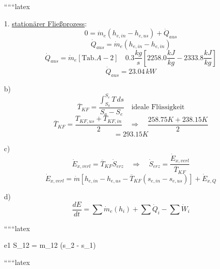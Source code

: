 
``````latex

1. \underline{stationärer Fließprozess}:
\[
0 = \dot{m}_e (h_{e,in} - h_{e,us}) + \dot{Q}_{aus}
\]
\[
\dot{Q}_{aus} = \dot{m}_e (h_{e,in} - h_{e,in})
\]
\[
\dot{Q}_{aus} = \dot{m}_e \left[ \text{Tab.} A-2 \right] \quad 0.3 \frac{kg}{s} \left[ 2258.0 \frac{kJ}{kg} - 2333.8 \frac{kJ}{kg} \right]
\]
\[
\dot{Q}_{aus} = 23.04 \, kW
\]

b)
\[
\overline{T}_{KF} = \frac{\int_{S_a}^{S_e} T \, ds}{S_a - S_e} \quad \text{ideale Flüssigkeit}
\]
\[
\overline{T}_{KF} = \frac{T_{KF,us} + T_{KF,in}}{2} \quad \Rightarrow \quad \frac{258.75 K + 238.15 K}{2}
\]
\[
= 293.15 K
\]

c)
\[
\dot{E}_{x,verl} = \overline{T}_{KF} \dot{S}_{erz} \quad \Rightarrow \quad \dot{S}_{erz} = \frac{\dot{E}_{x,verl}}{\overline{T}_{KF}}
\]
\[
\dot{E}_{x,verl} = \dot{m} \left[ h_{e,in} - h_{e,us} - \overline{T}_{KF} (s_{e,in} - s_{e,us}) \right] + \dot{E}_{x,Q}
\]

d)
\[
\frac{dE}{dt} = \sum \dot{m}_e (h_i) + \sum \dot{Q}_i - \sum \dot{W}_i
\]

``````latex


e1 \quad \Delta S_{12} = \Delta m_{12} (s_2 - s_1)

``````latex


